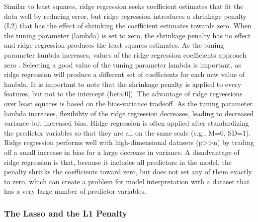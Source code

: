 \documentclass[sigconf]{acmart}
\begin{document}
Similar to least squares, ridge regression seeks coefficient estimates that
fit the data well by reducing error, but ridge regression introduces a 
shrinkage penalty (L2) that has the effect of shrinking the coefficient 
estimates towards zero. When the tuning parameter (lambda) is set to zero, 
the shrinkage penalty has no effect and ridge regression produces the least
squares estimates. As the tuning parameter lambda increases, values of the 
ridge regression coefficients approach zero \cite{statlearn13}. Selecting a 
good value of the tuning parameter lambda is important, as ridge
regression will produce a different set of coefficients for each new value of 
lambda. It is important to note that the shrinkage penalty is applied to every
features, but not to the intercept (beta[0]). The advantage of ridge 
regressions over least squares is based on the bias-variance tradeoff. As 
the tuning parameter lambda increases, flexibility of the ridge regression 
decreases, leading to decreased variance but increased bias. Ridge regression 
is often applied after standardizing the predictor variables so that they are 
all on the same scale (e.g., M=0, SD=1). Ridge regression performs 
well with high-dimensional datasets (p>>n) by trading off a small increase
in bias for a large decrease in variance. A disadvantage of ridge regression 
is that, because it includes all predictors in the model, the penalty shrinks
the coefficients toward zero, but does not set any of them exactly to zero, 
which can create a problem for model interpretation with a dataset that
has a very large number of predictor variables. 

\subsubsection{The Lasso and the L1 Penalty} 
\end{document}
